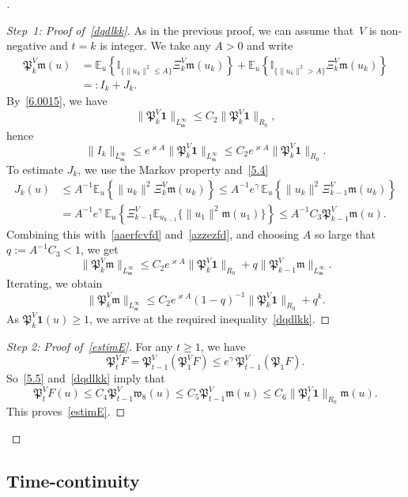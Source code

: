 \documentclass[10pt]{amsart}
\theoremstyle{definition}\newtheorem{defi}[theo]{Definition}\newtheorem{rema}[theo]{Remark}\newtheorem{exam}[theo]{Example}\newtheorem{exem}[theo]{Example}\newtheorem{nota}[theo]{Notation}
\newcommand{\mek}{{\mathbf 1}}
\newcommand{\I}{{\mathbb I}}
\newcommand{\E}{{\mathbb E}}
\newcommand{\vk}{{\varkappa}}
\newcommand{\wwww}{{\mathfrak w}}
\newcommand{\mm}{{\mathfrak m}}
\newcommand{\PPPP}{{\mathfrak P}}
\newenvironment{step}{\begin{proof}}{\let\qed\relax \end{proof}}
\newenvironment{proofc}[1][\proofname]{\begin{proof}[{#1}]}{\end{proof}}
\begin{document}
\begin{proofc}

\begin{step}[Step~1: Proof of~\eqref{dqdlkk}]
As in the previous proof, we can assume that~$V$ is non-negative and $t=k$ is integer. We take any $A>0$ and write
\begin{align}\label{aaerfcvfd}
\PPPP_k^V\mm (u)&= \E_u \left\{ \I_{\{\|u_k\|^2\le A\}} \Xi_k^V\mm(u_k) \right\}+ \E_u \left\{ \I_{\{\|u_k\|^2> A\}} \Xi_k^V\mm(u_k) \right\}\nonumber\\& =:I_k+J_k.
\end{align}
By~\eqref{6.0015}, we have
\[
\|\PPPP_k^V{\mek}\|_{L_\mm^\infty} \le C_2 \|\PPPP_{k}^V{\mek}\|_{R_0},
\]
hence
\begin{equation}\label{azzezfd}
\|I_k\|_{L_\mm^\infty} \le e^{\vk A} \|\PPPP_k^V{\mek}\|_{L_\mm^\infty} \le C_2 e^{\vk A} \|\PPPP_{k}^V{\mek}\|_{R_0}.
\end{equation}
To estimate $J_k$, we use the Markov property and~\eqref{5.4}
\begin{align*}
J_k(u)&\le A ^{-1} \E_u \left\{ \|u_k\|^2 \Xi_k^V\mm(u_k) \right\} \le A ^{-1}e^{\gamma}\, \E_u \left\{ \|u_k\|^2 \Xi_{k-1}^V \mm(u_k) \right\}\\&=A ^{-1} e^{\gamma}\, \E_u \left\{ \Xi_{k-1}^V\E_{u_{k-1}}\Big\{ \|u_1\|^2 \mm(u_1)\Big\} \right\} \le A^{-1} C_3 \PPPP_{k-1}^V\mm (u).
\end{align*}
Combining this with~\eqref{aaerfcvfd} and~\eqref{azzezfd}, and choosing $A$ so large that $q:=A^{-1} C_3<1$, we get
\[
\|\PPPP_k^V\mm\|_{L_\mm^\infty} \le C_2 e^{\vk A} \|\PPPP_{k}^V{\mek}\|_{R_0}+ q \|\PPPP_{k-1}^V\mm\|_{L_\mm^\infty}.
\]
Iterating, we obtain
\[
\|\PPPP_k^V\mm\|_{L_\mm^\infty} \le C_2 e^{\vk A} (1-q)^{-1} \|\PPPP_{k}^V{\mek}\|_{R_0}+ q^k.
\]
As $\PPPP_{k}^V{\mek}(u)\ge1$, we arrive at the required inequality~\eqref{dqdlkk}.
\end{step}

\begin{proof}[Step 2: Proof of~\eqref{estimE}]
For any $ t\ge1$, we have
\[
\PPPP_t^VF=\PPPP_{t-1}^V(\PPPP_1^VF)\le e^{\gamma}\,\PPPP_{t-1}^V(\PPPP_1F).
\]
So~\eqref{5.5} and~\eqref{dqdlkk} imply that
\[
\PPPP_t^VF(u) \le C_4\PPPP_{t-1}^V\wwww_8(u)\le C_5\PPPP_{t-1}^V\mm(u) \le C_6 \|\PPPP_{t}^V{\mek}\|_{R_0}\mm(u).
\]
This proves~\eqref{estimE}.
\end{proof}
\let\qed\relax
\end{proofc}

\subsection{Time-continuity}
\end{document}

